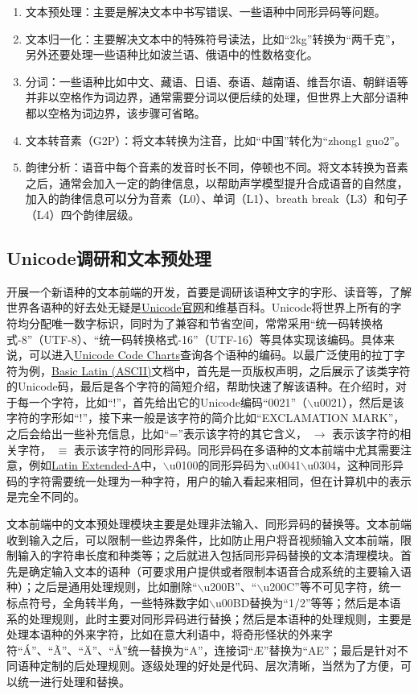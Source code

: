 \documentclass[cn,10pt,math=newtx,citestyle=gb7714-2015,bibstyle=gb7714-2015]{elegantbook}
\begin{document}
\begin{enumerate}
  \item 文本预处理：主要是解决文本中书写错误、一些语种中同形异码等问题。
  \item 文本归一化：主要解决文本中的特殊符号读法，比如“2kg”转换为“两千克”，另外还要处理一些语种比如波兰语、俄语中的性数格变化。
  \item 分词：一些语种比如中文、藏语、日语、泰语、越南语、维吾尔语、朝鲜语等并非以空格作为词边界，通常需要分词以便后续的处理，但世界上大部分语种都以空格为词边界，该步骤可省略。
  \item 文本转音素（G2P）：将文本转换为注音，比如“中国”转化为“zhong1 guo2”。
  \item 韵律分析：语音中每个音素的发音时长不同，停顿也不同。将文本转换为音素之后，通常会加入一定的韵律信息，以帮助声学模型提升合成语音的自然度，加入的韵律信息可以分为音素（L0）、单词（L1）、breath break（L3）和句子（L4）四个韵律层级。
\end{enumerate}

\subsection{Unicode调研和文本预处理}

开展一个新语种的文本前端的开发，首要是调研该语种文字的字形、读音等，了解世界各语种的好去处无疑是\href{https://unicode.org/main.html}{Unicode官网}和维基百科。Unicode将世界上所有的字符均分配唯一数字标识，同时为了兼容和节省空间，常常采用“统一码转换格式-8”（UTF-8）、“统一码转换格式-16”（UTF-16）等具体实现该编码。具体来说，可以进入\href{https://www.unicode.org/charts/}{Unicode Code Charts}查询各个语种的编码。以最广泛使用的拉丁字符为例，\href{https://www.unicode.org/charts/PDF/U0000.pdf}{Basic Latin (ASCII)}文档中，首先是一页版权声明，之后展示了该类字符的Unicode码，最后是各个字符的简短介绍，帮助快速了解该语种。在介绍时，对于每一个字符，比如“!”，首先给出它的Unicode编码“0021”（$\backslash$u0021），然后是该字符的字形如“!”，接下来一般是该字符的简介比如“EXCLAMATION MARK”，之后会给出一些补充信息，比如“=”表示该字符的其它含义， $\to$ 表示该字符的相关字符， $\equiv$ 表示该字符的同形异码。同形异码在多语种的文本前端中尤其需要注意，例如\href{https://www.unicode.org/charts/PDF/U0100.pdf}{Latin Extended-A}中，$\backslash$u0100的同形异码为$\backslash$u0041$\backslash$u0304，这种同形异码的字符需要统一处理为一种字符，用户的输入看起来相同，但在计算机中的表示是完全不同的。

文本前端中的文本预处理模块主要是处理非法输入、同形异码的替换等。文本前端收到输入之后，可以限制一些边界条件，比如防止用户将音视频输入文本前端，限制输入的字符串长度和种类等；之后就进入包括同形异码替换的文本清理模块。首先是确定输入文本的语种（可要求用户提供或者限制本语音合成系统的主要输入语种）；之后是通用处理规则，比如删除“$\backslash$u200B”、“$\backslash$u200C”等不可见字符，统一标点符号，全角转半角，一些特殊数字如$\backslash$u00BD替换为“1/2”等等；然后是本语系的处理规则，此时主要对同形异码进行替换；然后是本语种的处理规则，主要是处理本语种的外来字符，比如在意大利语中，将奇形怪状的外来字符“Á”、“Ã”、“Ä”、“Å”统一替换为“A”，连接词“Æ”替换为“AE”；最后是针对不同语种定制的后处理规则。逐级处理的好处是代码、层次清晰，当然为了方便，可以统一进行处理和替换。
\end{document}
